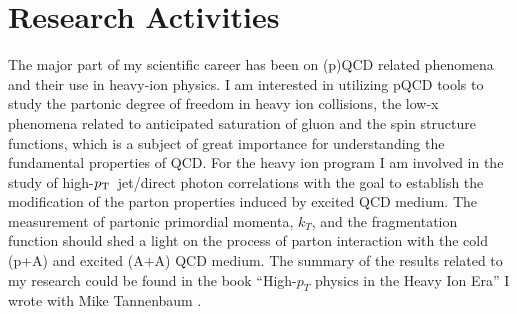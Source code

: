 \documentclass[12pt]{article}
\def\pt#1{\ensuremath{p_{\rm T#1}}}
\begin{document}
\section{Research Activities}
The major part of my scientific career has been on (p)QCD related phenomena and their use in heavy-ion physics.  I am interested in utilizing pQCD tools to study the partonic degree of freedom in heavy ion collisions, the low-x phenomena related to anticipated saturation of gluon and the spin structure functions, which is a subject of great importance for understanding the fundamental properties of QCD.  For the heavy ion program I am involved in the study of high-\pt{}\ jet/direct photon correlations with the goal to establish the modification of the parton properties induced by excited QCD medium.  The measurement of partonic primordial momenta, $k_T$, and the fragmentation function should shed a light on the process of parton interaction with the cold (p+A) and excited (A+A) QCD medium. 
The summary of the results related to my research could be found in the book ``High-$p_{T}$ physics in the Heavy Ion Era'' I wrote with Mike Tannenbaum  \cite{JanRak2013}.




\end{document}
